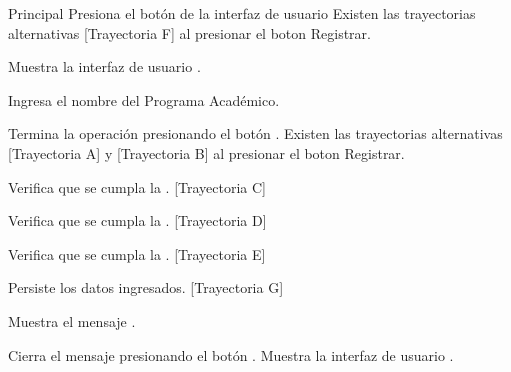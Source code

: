 \begin{UCtrayectoria}{Principal}
    \UCpaso[\UCactor] Presiona el botón de la interfaz de usuario Existen las trayectorias alternativas [Trayectoria F] al presionar el boton Registrar.   

    \UCpaso Muestra la interfaz de usuario .

    \UCpaso[\UCactor] Ingresa el nombre del Programa Académico.

    \UCpaso[\UCactor] Termina la operación presionando el botón . Existen las trayectorias alternativas [Trayectoria A] y [Trayectoria B] al presionar el boton Registrar.

    \UCpaso Verifica que se cumpla la . [Trayectoria C]

    \UCpaso Verifica que se cumpla la . [Trayectoria D]

    \UCpaso Verifica que se cumpla la . [Trayectoria E]

    \UCpaso Persiste los datos ingresados. [Trayectoria G]

    \UCpaso Muestra el mensaje .

    \UCpaso[\UCactor] Cierra el mensaje presionando el botón .
    \UCpaso Muestra la interfaz de usuario .
\end{UCtrayectoria}

